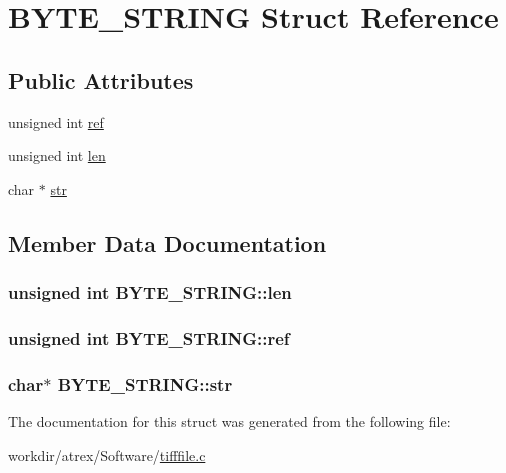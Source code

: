 \hypertarget{struct_b_y_t_e___s_t_r_i_n_g}{\section{B\-Y\-T\-E\-\_\-\-S\-T\-R\-I\-N\-G Struct Reference}
\label{struct_b_y_t_e___s_t_r_i_n_g}
}
\subsection*{Public Attributes}
\begin{DoxyCompactItemize}
\item 
unsigned int \hyperlink{struct_b_y_t_e___s_t_r_i_n_g_a8da8577d70c09a0f8dc481b4d28a7586}{ref}
\item 
unsigned int \hyperlink{struct_b_y_t_e___s_t_r_i_n_g_a99dbb11de28b137e585323a82ae6d886}{len}
\item 
char $\ast$ \hyperlink{struct_b_y_t_e___s_t_r_i_n_g_aa3466d17d921ace130316522aa93b161}{str}
\end{DoxyCompactItemize}


\subsection{Member Data Documentation}
\hypertarget{struct_b_y_t_e___s_t_r_i_n_g_a99dbb11de28b137e585323a82ae6d886}{
\subsubsection[{len}]{\setlength{\rightskip}{0pt plus 5cm}unsigned int B\-Y\-T\-E\-\_\-\-S\-T\-R\-I\-N\-G\-::len}}\label{struct_b_y_t_e___s_t_r_i_n_g_a99dbb11de28b137e585323a82ae6d886}
\hypertarget{struct_b_y_t_e___s_t_r_i_n_g_a8da8577d70c09a0f8dc481b4d28a7586}{
\subsubsection[{ref}]{\setlength{\rightskip}{0pt plus 5cm}unsigned int B\-Y\-T\-E\-\_\-\-S\-T\-R\-I\-N\-G\-::ref}}\label{struct_b_y_t_e___s_t_r_i_n_g_a8da8577d70c09a0f8dc481b4d28a7586}
\hypertarget{struct_b_y_t_e___s_t_r_i_n_g_aa3466d17d921ace130316522aa93b161}{
\subsubsection[{str}]{\setlength{\rightskip}{0pt plus 5cm}char$\ast$ B\-Y\-T\-E\-\_\-\-S\-T\-R\-I\-N\-G\-::str}}\label{struct_b_y_t_e___s_t_r_i_n_g_aa3466d17d921ace130316522aa93b161}


The documentation for this struct was generated from the following file\-:\begin{DoxyCompactItemize}
\item 
workdir/atrex/\-Software/\hyperlink{tifffile_8c}{tifffile.\-c}\end{DoxyCompactItemize}
